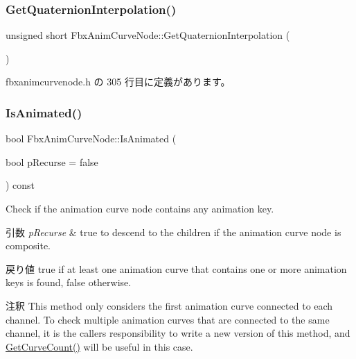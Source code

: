 \subsubsection{\texorpdfstring{Get\+Quaternion\+Interpolation()}{GetQuaternionInterpolation()}}
{\footnotesize\ttfamily unsigned short Fbx\+Anim\+Curve\+Node\+::\+Get\+Quaternion\+Interpolation (\begin{DoxyParamCaption}{ }\end{DoxyParamCaption})\hspace{0.3cm}{\ttfamily [inline]}}



 fbxanimcurvenode.\+h の 305 行目に定義があります。

\mbox{\label{class_fbx_anim_curve_node_ad9ca0ff8cf30e3b55c91184be5f693ac}} 
\subsubsection{\texorpdfstring{Is\+Animated()}{IsAnimated()}}
{\footnotesize\ttfamily bool Fbx\+Anim\+Curve\+Node\+::\+Is\+Animated (\begin{DoxyParamCaption}\item[{bool}]{p\+Recurse = {\ttfamily false} }\end{DoxyParamCaption}) const}

Check if the animation curve node contains any animation key. 
\begin{DoxyParams}{引数}
{\em p\+Recurse} & {\ttfamily true} to descend to the children if the animation curve node is composite. \\
\hline
\end{DoxyParams}
\begin{DoxyReturn}{戻り値}
{\ttfamily true} if at least one animation curve that contains one or more animation keys is found, {\ttfamily false} otherwise. 
\end{DoxyReturn}
\begin{DoxyRemark}{注釈}
This method only considers the first animation curve connected to each channel. To check multiple animation curves that are connected to the same channel, it is the caller\textquotesingle{}s responsibility to write a new version of this method, and \hyperlink{class_fbx_anim_curve_node_a41d28a650fa90706d1c67ad5f56530b5}{Get\+Curve\+Count()} will be useful in this case. 
\end{DoxyRemark}
\mbox{\label{class_fbx_anim_curve_node_ad0fd9df109fb4e9c8702d37f03b6cc03}} 

